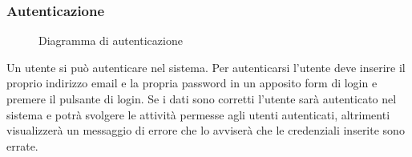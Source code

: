 \documentclass[a4paper, titlepage]{article}
\begin{document}
\subsubsection{Autenticazione}
\begin{figure}[H]
	\centering
	\noindent{}
	\caption{Diagramma di autenticazione}
\end{figure}
Un utente si può autenticare nel sistema. Per autenticarsi l'utente deve inserire il proprio indirizzo email e la propria password in un apposito form di login e premere il pulsante di login. Se i dati sono corretti l'utente sarà autenticato nel sistema e potrà svolgere le attività permesse agli utenti autenticati, altrimenti visualizzerà un messaggio di errore che lo avviserà che le credenziali inserite sono errate. 

\newpage
\end{document}
